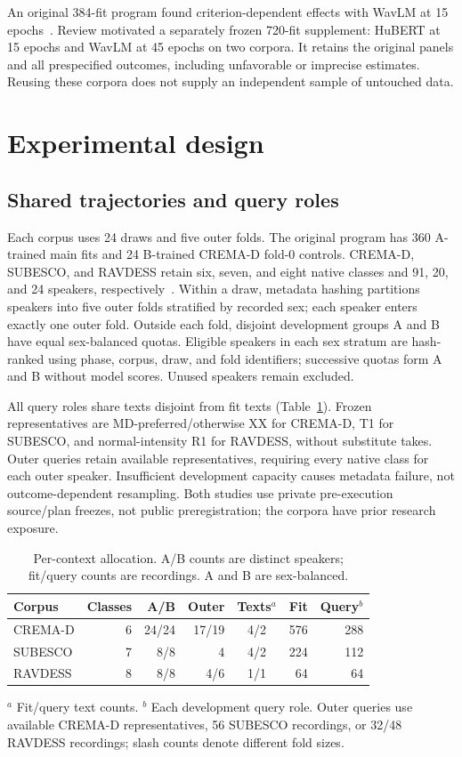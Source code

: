 \documentclass[letterpaper]{article}
\begin{document}
An original 384-fit program found criterion-dependent effects with WavLM at 15 epochs~\cite{artifact}. Review motivated a separately frozen 720-fit supplement: HuBERT at 15 epochs and WavLM at 45 epochs on two corpora. It retains the original panels and all prespecified outcomes, including unfavorable or imprecise estimates. Reusing these corpora does not supply an independent sample of untouched data.

\section{Experimental design}
\subsection{Shared trajectories and query roles}
Each corpus uses 24 draws and five outer folds. The original program has 360 A-trained main fits and 24 B-trained CREMA-D fold-0 controls. CREMA-D, SUBESCO, and RAVDESS retain six, seven, and eight native classes and 91, 20, and 24 speakers, respectively~\cite{cremad,subesco,ravdess}. Within a draw, metadata hashing partitions speakers into five outer folds stratified by recorded sex; each speaker enters exactly one outer fold. Outside each fold, disjoint development groups A and B have equal sex-balanced quotas. Eligible speakers in each sex stratum are hash-ranked using phase, corpus, draw, and fold identifiers; successive quotas form A and B without model scores. Unused speakers remain excluded.

All query roles share texts disjoint from fit texts (Table~\ref{tab:panels}). Frozen representatives are MD-preferred/otherwise XX for CREMA-D, T1 for SUBESCO, and normal-intensity R1 for RAVDESS, without substitute takes. Outer queries retain available representatives, requiring every native class for each outer speaker. Insufficient development capacity causes metadata failure, not outcome-dependent resampling. Both studies use private pre-execution source/plan freezes, not public preregistration; the corpora have prior research exposure.

\begin{table}[t]
\centering\small
\caption{Per-context allocation. A/B counts are distinct speakers; fit/query counts are recordings. A and B are sex-balanced.}
\label{tab:panels}
\setlength{\tabcolsep}{3pt}
\begin{tabular}{lrrrcrr}\toprule
Corpus & Classes & A/B & Outer & Texts$^a$ & Fit & Query$^b$\\\midrule
CREMA-D & 6 & 24/24 & 17/19 & 4/2 & 576 & 288\\
SUBESCO & 7 & 8/8 & 4 & 4/2 & 224 & 112\\
RAVDESS & 8 & 8/8 & 4/6 & 1/1 & 64 & 64\\\bottomrule
\end{tabular}
\par\raggedright\small
$^a$ Fit/query text counts. $^b$ Each development query role. Outer queries use available CREMA-D representatives, 56 SUBESCO recordings, or 32/48 RAVDESS recordings; slash counts denote different fold sizes.
\end{table}
\end{document}
